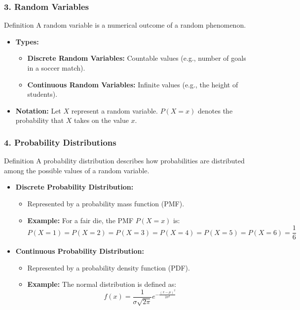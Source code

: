 \documentclass[aspectratio=169]{beamer}
\begin{document}
\begin{frame}[fragile]
    \frametitle{3. Random Variables}
    \begin{block}{Definition}
        A random variable is a numerical outcome of a random phenomenon.
    \end{block}
    
    \begin{itemize}
        \item \textbf{Types:}
        \begin{itemize}
            \item \textbf{Discrete Random Variables:} Countable values (e.g., number of goals in a soccer match).
            \item \textbf{Continuous Random Variables:} Infinite values (e.g., the height of students).
        \end{itemize}
        
        \item \textbf{Notation:} Let \( X \) represent a random variable. \( P(X = x) \) denotes the probability that \( X \) takes on the value \( x \).
    \end{itemize}
\end{frame}

\begin{frame}[fragile]
    \frametitle{4. Probability Distributions}
    \begin{block}{Definition}
        A probability distribution describes how probabilities are distributed among the possible values of a random variable.
    \end{block}
    
    \begin{itemize}
        \item \textbf{Discrete Probability Distribution:} 
            \begin{itemize}
                \item Represented by a probability mass function (PMF). 
                \item \textbf{Example:} For a fair die, the PMF \( P(X=x) \) is: 
                \[
                P(X=1) = P(X=2) = P(X=3) = P(X=4) = P(X=5) = P(X=6) = \frac{1}{6}
                \]
            \end{itemize}

        \item \textbf{Continuous Probability Distribution:}
            \begin{itemize}
                \item Represented by a probability density function (PDF).
                \item \textbf{Example:} The normal distribution is defined as:
                \begin{equation}
                f(x) = \frac{1}{\sigma\sqrt{2\pi}} e^{-\frac{(x - \mu)^2}{2\sigma^2}}
                \end{equation}
            \end{itemize}
    \end{itemize}
\end{frame}
\end{document}
